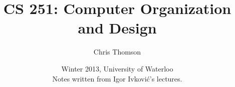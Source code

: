 \documentclass[]{article}
\begin{document}
\title{\bf{CS 251: Computer Organization and Design}}
\date{Winter 2013, University of Waterloo \\ \center Notes written from Igor Ivkovi\'c's lectures.}
\author{Chris Thomson}
\maketitle
\newpage
\end{document}
